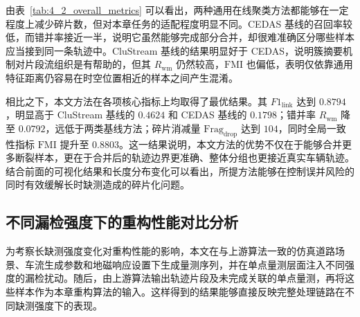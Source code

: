 \documentclass{xdupgthesis}
\begin{document}
\begin{table}[htbp]
	\centering
	\caption{不同方法在主场景下的总体聚类重构效果对比}
	\label{tab:4_2_overall_metrics}
	\renewcommand{\arraystretch}{1.15}
\end{table}

由表~\ref{tab:4_2_overall_metrics} 可以看出，两种通用在线聚类方法都能够在一定程度上减少碎片数，但对本章任务的适配程度明显不同。CEDAS 基线的召回率较低，而错并率接近一半，说明它虽然能够完成部分合并，却很难准确区分哪些样本应当接到同一条轨迹中。CluStream 基线的结果明显好于 CEDAS，说明簇摘要机制对片段流组织是有帮助的，但其 $R_{\mathrm{wm}}$ 仍然较高，$\mathrm{FMI}$ 也偏低，表明仅依靠通用特征距离仍容易在时空位置相近的样本之间产生混淆。

相比之下，本文方法在各项核心指标上均取得了最优结果。其 $F1_{\mathrm{link}}$ 达到 $0.8794$，明显高于 CluStream 基线的 $0.4624$ 和 CEDAS 基线的 $0.1798$；错并率 $R_{\mathrm{wm}}$ 降至 $0.0792$，远低于两类基线方法；碎片消减量 $\mathrm{Frag}_{\mathrm{drop}}$ 达到 $104$，同时全局一致性指标 $\mathrm{FMI}$ 提升至 $0.8803$。这一结果说明，本文方法的优势不仅在于能够合并更多断裂样本，更在于合并后的轨迹边界更准确、整体分组也更接近真实车辆轨迹。结合前面的可视化结果和长度分布变化可以看出，所提方法能够在控制误并风险的同时有效缓解长时缺测造成的碎片化问题。

\subsection{不同漏检强度下的重构性能对比分析}

为考察长缺测强度变化对重构性能的影响，本文在与上游算法一致的仿真道路场景、车流生成参数和地磁响应设置下生成量测序列，并在单点量测层面注入不同强度的漏检扰动。随后，由上游算法输出轨迹片段及未完成关联的单点量测，再将这些样本作为本章重构算法的输入。这样得到的结果能够直接反映完整处理链路在不同缺测强度下的表现。
\end{document}
